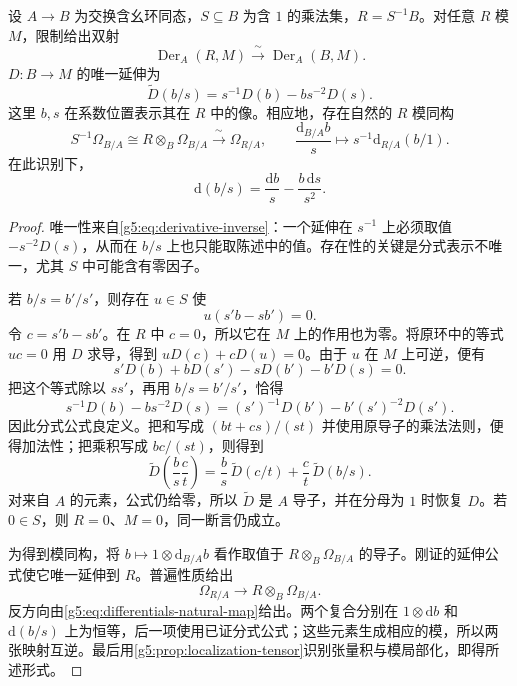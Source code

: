 \begin{proposition}\label{g5:prop:localized-differentials}
	设 \(A\to B\) 为交换含幺环同态，\(S\subseteq B\) 为含 \(1\) 的乘法集，\(R=S^{-1}B\)。对任意 \(R\) 模 \(M\)，限制给出双射
	\[
		\operatorname{Der}_A(R,M)
		\xrightarrow{\ \sim\ }\operatorname{Der}_A(B,M).
	\]
	\(D:B\to M\) 的唯一延伸为
	\[
		\widetilde D(b/s)=s^{-1}D(b)-bs^{-2}D(s).
	\]
	这里 \(b,s\) 在系数位置表示其在 \(R\) 中的像。相应地，存在自然的 \(R\) 模同构
	\[
		S^{-1}\Omega_{B/A}
		\cong R\otimes_B\Omega_{B/A}
		\xrightarrow{\ \sim\ }\Omega_{R/A},
		\qquad
		\frac{\mathrm{d}_{B/A}b}{s}
		\longmapsto s^{-1}\mathrm{d}_{R/A}(b/1).
	\]
	在此识别下，
	\begin{equation}\label{g5:eq:localized-universal-derivative}
		\mathrm{d}(b/s)
		=\frac{\mathrm{d}b}{s}-\frac{b\,\mathrm{d}s}{s^2}.
	\end{equation}
\end{proposition}
\begin{proof}
	唯一性来自\eqref{g5:eq:derivative-inverse}：一个延伸在 \(s^{-1}\) 上必须取值 \(-s^{-2}D(s)\)，从而在 \(b/s\) 上也只能取陈述中的值。存在性的关键是分式表示不唯一，尤其 \(S\) 中可能含有零因子。

	若 \(b/s=b'/s'\)，则存在 \(u\in S\) 使
	\[
		u(s'b-sb')=0.
	\]
	令 \(c=s'b-sb'\)。在 \(R\) 中 \(c=0\)，所以它在 \(M\) 上的作用也为零。将原环中的等式 \(uc=0\) 用 \(D\) 求导，得到
	\(uD(c)+cD(u)=0\)。由于 \(u\) 在 \(M\) 上可逆，便有
	\[
		s'D(b)+bD(s')-sD(b')-b'D(s)=0.
	\]
	把这个等式除以 \(ss'\)，再用 \(b/s=b'/s'\)，恰得
	\[
		s^{-1}D(b)-bs^{-2}D(s)
		=(s')^{-1}D(b')-b'(s')^{-2}D(s').
	\]
	因此分式公式良定义。把和写成 \((bt+cs)/(st)\) 并使用原导子的乘法法则，便得加法性；把乘积写成 \(bc/(st)\)，则得到
	\[
		\widetilde D\!\left(\frac bs\frac ct\right)
		=\frac bs\,\widetilde D(c/t)+\frac ct\,\widetilde D(b/s).
	\]
	对来自 \(A\) 的元素，公式仍给零，所以 \(\widetilde D\) 是 \(A\) 导子，并在分母为 \(1\) 时恢复 \(D\)。若 \(0\in S\)，则 \(R=0\)、\(M=0\)，同一断言仍成立。

	为得到模同构，将 \(b\mapsto1\otimes\mathrm{d}_{B/A}b\) 看作取值于 \(R\otimes_B\Omega_{B/A}\) 的导子。刚证的延伸公式使它唯一延伸到 \(R\)。普遍性质给出
	\[
		\Omega_{R/A}\longrightarrow R\otimes_B\Omega_{B/A}.
	\]
	反方向由\eqref{g5:eq:differentials-natural-map}给出。两个复合分别在 \(1\otimes\mathrm{d}b\) 和 \(\mathrm{d}(b/s)\) 上为恒等，后一项使用已证分式公式；这些元素生成相应的模，所以两张映射互逆。最后用\cref{g5:prop:localization-tensor}识别张量积与模局部化，即得所述形式。
\end{proof}

